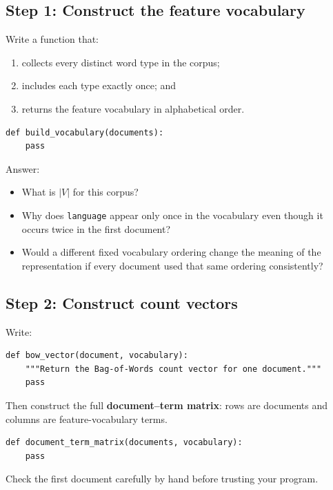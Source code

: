 \documentclass[11pt,a4paper]{article}
\begin{document}
\subsection{Step 1: Construct the feature vocabulary}

Write a function that:

\begin{enumerate}
  \item collects every distinct word type in the corpus;
  \item includes each type exactly once; and
  \item returns the feature vocabulary in alphabetical order.
\end{enumerate}

\begin{lstlisting}
def build_vocabulary(documents):
    pass
\end{lstlisting}

Answer:

\begin{itemize}
  \item What is $|V|$ for this corpus?
  \item Why does \texttt{language} appear only once in the vocabulary even though it occurs twice in the first document?
  \item Would a different fixed vocabulary ordering change the meaning of the representation if every document used that same ordering consistently?
\end{itemize}

\subsection{Step 2: Construct count vectors}

Write:

\begin{lstlisting}
def bow_vector(document, vocabulary):
    """Return the Bag-of-Words count vector for one document."""
    pass
\end{lstlisting}

Then construct the full \textbf{document--term matrix}: rows are documents and columns are feature-vocabulary terms.

\begin{lstlisting}
def document_term_matrix(documents, vocabulary):
    pass
\end{lstlisting}

Check the first document carefully by hand before trusting your program.
\end{document}
